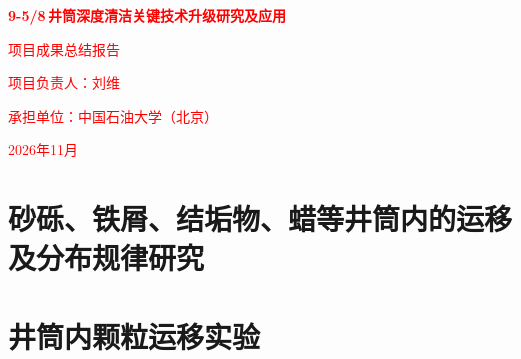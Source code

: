 \documentclass[12pt, a4paper, zihao=-4, openright]{ctexrep}
\newcommand{\inch}{\,\text{''}} %
\begin{document}




\begin{titlepage}
    \centering 
    \vspace*{4cm} 
    {\Huge \bfseries \textcolor{red}{9-5/8\inch 井筒深度清洁关键技术升级研究及应用} \par} 
    \vspace{2cm} 
    {\Large \textcolor{red}{项目成果总结报告} \par} 
    \vspace{4cm} 
    {\Large \textcolor{red}{项目负责人：刘维} \par}
    \vspace{1cm}
    {\Large \textcolor{red}{承担单位：中国石油大学（北京）} \par}
    \vspace{1cm}
    {\Large \textcolor{red}{2026年11月} \par}
\end{titlepage}

\clearpage
{}


\clearpage
\tableofcontents

\clearpage
{} 
\setcounter{page}{1}   




\chapter{砂砾、铁屑、结垢物、蜡等井筒内的运移及分布规律研究}
     
    
    
    
\chapter{井筒内颗粒运移实验}
\end{document}
